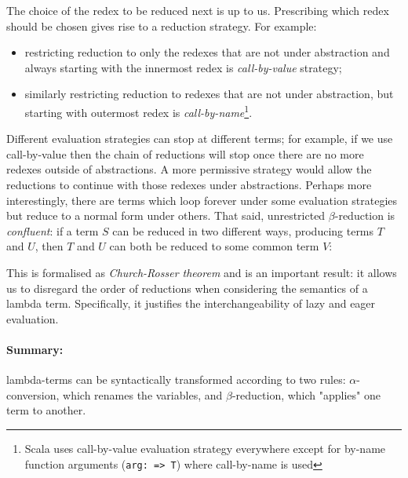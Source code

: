 \documentclass[11pt,twoside,a4paper]{article} %
\begin{document}
The choice of the redex to be reduced next is up to us. Prescribing which redex
should be chosen gives rise to a reduction strategy. For example:
\begin{itemize}
\item restricting reduction to only the redexes that are not under abstraction
and always starting with the innermost redex is \emph{call-by-value} strategy;
\item similarly restricting reduction to redexes that are not under
abstraction, but starting with outermost redex is \emph{call-by-name}\footnote{
Scala uses call-by-value evaluation strategy everywhere except for by-name
function arguments (\texttt{arg: => T}) where call-by-name is used}.
\end{itemize}
Different evaluation strategies can stop at different terms; for example, if we
use call-by-value then the chain of reductions will stop once there are no more
redexes outside of abstractions. A more permissive strategy would allow the
reductions to continue with those redexes under abstractions. Perhaps more
interestingly, there are terms which loop forever under some evaluation
strategies but reduce to a normal form under others. That said, unrestricted 
$\beta$-reduction is \emph{confluent}: if a term $S$ can be reduced in two 
different ways, producing terms $T$ and $U$, then $T$ and $U$ can both be reduced 
to some common term $V$:
\begin{center}
\end{center}
This is formalised as \emph{Church-Rosser theorem} and is an
important result: it allows us to disregard the order of reductions when
considering the semantics of a lambda term. Specifically, it justifies the
interchangeability of lazy and eager evaluation.

\paragraph{Summary:} lambda-terms can be syntactically transformed according to 
two rules: $\alpha$-conversion, which renames the variables, and $\beta$-reduction,
which "applies" one term to another.
\end{document}
